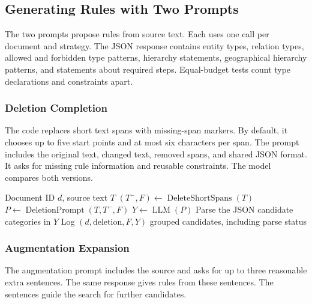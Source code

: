 \subsection{Generating Rules with Two Prompts}

\label{subsec:llm_rule}

The two prompts propose rules from source text. Each uses one call per
document and strategy. The JSON response contains entity types, relation
types, allowed and forbidden type patterns, hierarchy statements,
geographical hierarchy patterns, and statements about required steps.
Equal-budget tests count type declarations and constraints apart.

\subsubsection{Deletion Completion}

\label{subsubsec:deletion}

The code replaces short text spans with missing-span markers.
By default, it chooses up to five start points and at most six characters
per span. The prompt includes the original text, changed text, removed
spans, and shared JSON format. It asks for missing rule information and
reusable constraints. The model compares both versions.

\begin{algorithm}[t]
\caption{Deletion-completion steps}
\label{alg:deletion_completion}
\begin{algorithmic}[1]
\Require Document ID $d$, source text $T$
\State $(T^-,F)\leftarrow\operatorname{DeleteShortSpans}(T)$
\State $P\leftarrow\operatorname{DeletionPrompt}(T,T^-,F)$
\State $Y\leftarrow\operatorname{LLM}(P)$ 
\State Parse the JSON candidate categories in $Y$
\State Log $(d,\text{deletion},F,Y)$
\State \Return grouped candidates, including parse status
\end{algorithmic}
\end{algorithm}

\subsubsection{Augmentation Expansion}

\label{subsubsec:augmentation}

The augmentation prompt includes the source and asks for up to three
reasonable extra sentences. The same response gives rules from these sentences.
The sentences guide the search for further candidates.

